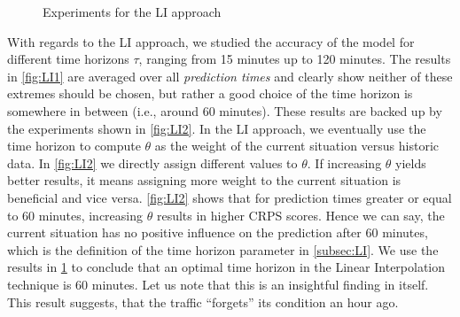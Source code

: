 \begin{figure}[h]
    \centering
    \caption{Experiments for the LI approach}\label{fig:LI}
\end{figure}



With regards to the LI approach, we studied the accuracy of the model for
different time horizons $\tau$, ranging from 15 minutes up to 120 minutes. The
results in \cref{fig:LI1} are averaged over all \textit{prediction times} and
clearly show neither of these extremes should be chosen, but rather a good
choice of the time horizon is somewhere in between (i.e., around 60 minutes).
These results are backed up by the experiments shown in \cref{fig:LI2}. In the
LI approach, we eventually use the time horizon to compute $\theta$ as the
weight of the current situation versus historic data. In \cref{fig:LI2} we
directly assign different values to $\theta$. If increasing $\theta$ yields
better results, it means assigning more weight to the current situation is
beneficial and vice versa. \cref{fig:LI2} shows that for prediction times
greater or equal to 60 minutes, increasing $\theta$ results in higher CRPS
scores. Hence we can say, the current situation has no positive influence on the
prediction after 60 minutes, which is the definition of the time horizon
parameter in \cref{subsec:LI}. We use the results in \cref{fig:LI} to conclude
that an optimal time horizon in the Linear Interpolation technique is 60
minutes. Let us note that this is an insightful finding in itself. This result
suggests, that the traffic ``forgets'' its condition an hour ago.

